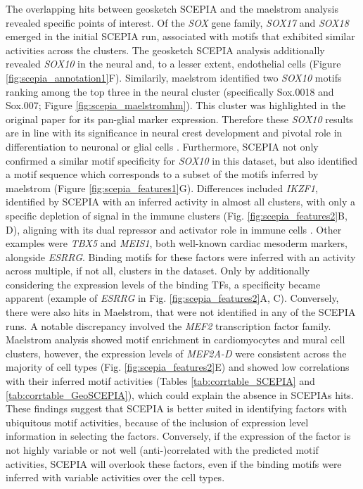 The overlapping hits between geosketch SCEPIA and the maelstrom analysis revealed specific points of interest. Of the \textit{SOX} gene family, \textit{SOX17} and \textit{SOX18} emerged in the initial SCEPIA run, associated with motifs that exhibited similar activities across the clusters. The geosketch SCEPIA analysis additionally revealed \textit{SOX10} in the neural and, to a lesser extent, endothelial cells (Figure \ref{fig:scepia_annotation1}F). Similarily, maelstrom identified two \textit{SOX10} motifs ranking among the top three in the neural cluster (specifically Sox.0018 and Sox.007; Figure \ref{fig:scepia_maelstromhm}). This cluster was highlighted in the original paper for its pan-glial marker expression. Therefore these \textit{SOX10} results are in line with its significance in neural crest development and pivotal role in differentiation to neuronal or glial cells \cite{Lai2021}. Furthermore, SCEPIA not only confirmed a similar motif specificity for \textit{SOX10} in this dataset, but also identified a motif sequence which corresponds to a subset of the motifs inferred by maelstrom (Figure \ref{fig:scepia_features1}G). Differences included \textit{IKZF1}, identified by SCEPIA with an inferred activity in almost all clusters, with only a specific depletion of signal in the immune clusters (Fig. \ref{fig:scepia_features2}B, D), aligning with its dual repressor and activator role in immune cells \cite{Marke2018}. Other examples were \textit{TBX5} and \textit{MEIS1}, both well-known cardiac mesoderm markers, alongside \textit{ESRRG}. Binding motifs for these factors were inferred with an activity across multiple, if not all, clusters in the dataset. Only by additionally considering the expression levels of the binding TFs, a specificity became apparent (example of \textit{ESRRG} in Fig. \ref{fig:scepia_features2}A, C). Conversely, there were also hits in Maelstrom, that were not identified in any of the SCEPIA runs. A notable discrepancy involved the \textit{MEF2} transcription factor family. Maelstrom analysis showed motif enrichment in cardiomyocytes and mural cell clusters, however, the expression levels of \textit{MEF2A-D} were consistent across the majority of cell types (Fig. \ref{fig:scepia_features2}E) and showed low correlations with their inferred motif activities (Tables \ref{tab:corrtable_SCEPIA} and \ref{tab:corrtable_GeoSCEPIA}), which could explain the absence in SCEPIAs hits. These findings suggest that SCEPIA is better suited in identifying factors with ubiquitous motif activities, because of the inclusion of expression level information in selecting the factors. Conversely, if the expression of the factor is not highly variable or not well (anti-)correlated with the predicted motif activities, SCEPIA will overlook these factors, even if the binding motifs were inferred with variable activities over the cell types.

